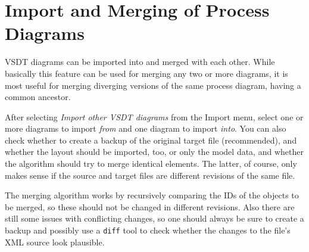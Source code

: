 \section{Import and Merging of Process Diagrams}
\label{sec:user_features_merging}

VSDT diagrams can be imported into and merged with each other. While basically this feature can be
used for merging any two or more diagrams, it is most useful for merging diverging versions of the
same process diagram, having a common ancestor.

After selecting \emph{Import other VSDT diagrams} from the Import menu, select one or more diagrams
to import \emph{from} and one diagram to import \emph{into}. You can also check whether to create a
backup of the original target file (recommended), and whether the layout should be imported, too, or
only the model data, and whether the algorithm should try to merge identical elements. The latter,
of course, only makes sense if the source and target files are different revisions of the same file.

The merging algorithm works by recursively comparing the IDs of the objects to be merged, so these
should not be changed in different revisions. Also there are still some issues with conflicting
changes, so one should always be sure to create a backup and possibly use a \texttt{diff} tool to
check whether the changes to the file's XML source look plausible.

